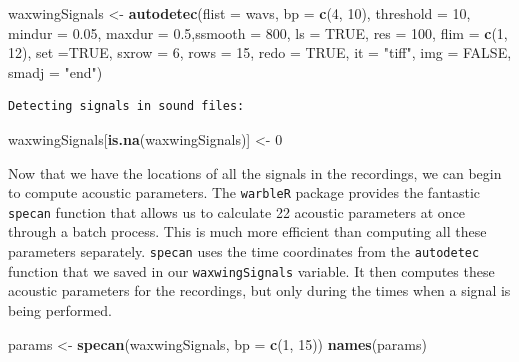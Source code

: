 \documentclass[
]{krantz}
\makeatletter
\newenvironment{Shaded}{\begin{snugshade}}{\end{snugshade}}
\newcommand{\DataTypeTok}[1]{\textcolor[rgb]{0.27,0.27,0.27}{#1}}
\newcommand{\DecValTok}[1]{\textcolor[rgb]{0.06,0.06,0.06}{#1}}
\newcommand{\FloatTok}[1]{\textcolor[rgb]{0.06,0.06,0.06}{#1}}
\newcommand{\KeywordTok}[1]{\textcolor[rgb]{0.27,0.27,0.27}{\textbf{#1}}}
\newcommand{\NormalTok}[1]{#1}
\newcommand{\OtherTok}[1]{\textcolor[rgb]{0.37,0.37,0.37}{#1}}
\newcommand{\StringTok}[1]{\textcolor[rgb]{0.5,0.5,0.5}{#1}}
\newenvironment{kframe}{%
\medskip{}
\setlength{\fboxsep}{.8em}
 \def\at@end@of@kframe{}%
 \ifinner\ifhmode%
  \def\at@end@of@kframe{\end{minipage}}%
  \begin{minipage}{\columnwidth}%
 \fi\fi%
 \def\FrameCommand##1{\hskip\@totalleftmargin \hskip-\fboxsep
 \colorbox{shadecolor}{##1}\hskip-\fboxsep
     \hskip-\linewidth \hskip-\@totalleftmargin \hskip\columnwidth}%
 \MakeFramed {\advance\hsize-\width
   \@totalleftmargin\z@ \linewidth\hsize
   \@setminipage}}%
 {\par\unskip\endMakeFramed%
 \at@end@of@kframe}
\renewenvironment{Shaded}{\begin{kframe}}{\end{kframe}}
\makeatother
\begin{document}
\begin{Shaded}
\begin{Highlighting}[]
\NormalTok{waxwingSignals \textless{}{-}}\StringTok{ }\KeywordTok{autodetec}\NormalTok{(}\DataTypeTok{flist =}\NormalTok{ wavs, }\DataTypeTok{bp =} \KeywordTok{c}\NormalTok{(}\DecValTok{4}\NormalTok{, }\DecValTok{10}\NormalTok{), }\DataTypeTok{threshold =} \DecValTok{10}\NormalTok{, }\DataTypeTok{mindur =} \FloatTok{0.05}\NormalTok{,  }
          \DataTypeTok{maxdur =} \FloatTok{0.5}\NormalTok{,}\DataTypeTok{ssmooth =} \DecValTok{800}\NormalTok{, }\DataTypeTok{ls =} \OtherTok{TRUE}\NormalTok{,  }
          \DataTypeTok{res =} \DecValTok{100}\NormalTok{, }\DataTypeTok{flim =} \KeywordTok{c}\NormalTok{(}\DecValTok{1}\NormalTok{, }\DecValTok{12}\NormalTok{), }\DataTypeTok{set =}\OtherTok{TRUE}\NormalTok{, }\DataTypeTok{sxrow =} \DecValTok{6}\NormalTok{,  }
          \DataTypeTok{rows =} \DecValTok{15}\NormalTok{, }\DataTypeTok{redo =} \OtherTok{TRUE}\NormalTok{, }\DataTypeTok{it =} \StringTok{"tiff"}\NormalTok{, }\DataTypeTok{img =} \OtherTok{FALSE}\NormalTok{, }\DataTypeTok{smadj =} \StringTok{"end"}\NormalTok{) }
\end{Highlighting}
\end{Shaded}

\begin{verbatim}
Detecting signals in sound files:
\end{verbatim}

\begin{Shaded}
\begin{Highlighting}[]
\NormalTok{waxwingSignals[}\KeywordTok{is.na}\NormalTok{(waxwingSignals)] \textless{}{-}}\StringTok{ }\DecValTok{0} 
\end{Highlighting}
\end{Shaded}

Now that we have the locations of all the signals in the recordings, we can begin to compute acoustic parameters. The \texttt{warbleR} package provides the fantastic \texttt{specan} function that allows us to calculate 22 acoustic parameters at once through a batch process. This is much more efficient than computing all these parameters separately. \texttt{specan} uses the time coordinates from the \texttt{autodetec} function that we saved in our \texttt{waxwingSignals} variable. It then computes these acoustic parameters for the recordings, but only during the times when a signal is being performed.

\begin{Shaded}
\begin{Highlighting}[]
\NormalTok{params \textless{}{-}}\StringTok{ }\KeywordTok{specan}\NormalTok{(waxwingSignals, }\DataTypeTok{bp =} \KeywordTok{c}\NormalTok{(}\DecValTok{1}\NormalTok{, }\DecValTok{15}\NormalTok{)) }
\KeywordTok{names}\NormalTok{(params) }
\end{Highlighting}
\end{Shaded}
\end{document}
